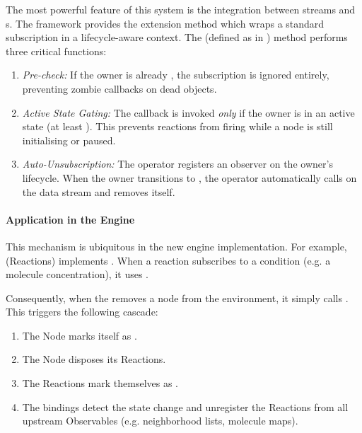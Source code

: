 The most powerful feature of this system is the integration between
\linebreak{} streams and s. The framework
provides the extension method  which wraps a standard
subscription in a lifecycle-aware context.
%
%
The  (defined as in ) method performs three critical
functions:
\begin{enumerate}
	\item \emph{Pre-check:} If the owner is already , the
	      subscription is ignored entirely, preventing zombie callbacks on dead
	      objects.
	\item \emph{Active State Gating:} The callback is invoked \emph{only}
	      if the owner is in an active state (at least ).
	      This prevents reactions from firing while a node is still
	      initialising or paused.
	\item \emph{Auto-Unsubscription:} The operator registers an observer on
	      the owner's lifecycle. When the owner transitions to
	      , the operator automatically calls
	       on the data stream and removes itself.
\end{enumerate}

\paragraph{Application in the Engine}
This mechanism is ubiquitous in the new engine implementation. For example,
 (Reactions) implements \linebreak{}. When a
reaction subscribes to a condition (e.g. a molecule concentration), it uses
.

Consequently, when the  removes a node from the environment, it
simply calls . This triggers the following cascade:
\begin{enumerate}
	\item The Node marks itself as .
	\item The Node disposes its Reactions.
	\item The Reactions mark themselves as .
	\item The  bindings detect the state change and
	      unregister the Reactions from all upstream Observables (e.g.
	      neighborhood lists, molecule maps).
\end{enumerate}


